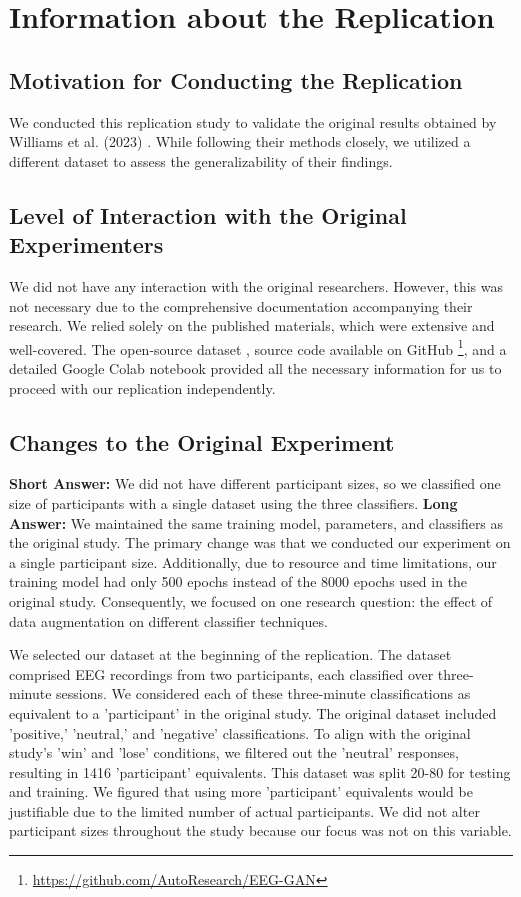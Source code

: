\documentclass[10pt,letterpaper]{article}
\begin{document}
\section{Information about the Replication}

\subsection{Motivation for Conducting the Replication}
We conducted this replication study to validate the original results obtained by Williams et al. (2023) \cite{originalpaper}. While following their methods closely, we utilized a different dataset \cite{ourdataset} to assess the generalizability of their findings.

\subsection{Level of Interaction with the Original Experimenters}
We did not have any interaction with the original researchers. However, this was not necessary due to the comprehensive documentation accompanying their research. We relied solely on the published materials, which were extensive and well-covered. The open-source dataset \cite{originaldataset}, source code available on GitHub \footnote{\url{https://github.com/AutoResearch/EEG-GAN}}, and a detailed Google Colab notebook provided all the necessary information for us to proceed with our replication independently.

\subsection{Changes to the Original Experiment}
\textbf{Short Answer:} We did not have different participant sizes, so we classified one size of participants with a single dataset using the three classifiers. \textbf{Long Answer:} We maintained the same training model, parameters, and classifiers as the original study. The primary change was that we conducted our experiment on a single participant size. Additionally, due to resource and time limitations, our training model had only 500 epochs instead of the 8000 epochs used in the original study. Consequently, we focused on one research question: the effect of data augmentation on different classifier techniques.

We selected our dataset at the beginning of the replication. The dataset \cite{ourdataset} comprised EEG recordings from two participants, each classified over three-minute sessions. We considered each of these three-minute classifications as equivalent to a 'participant' in the original study. The original dataset included 'positive,' 'neutral,' and 'negative' classifications. To align with the original study's 'win' and 'lose' conditions, we filtered out the 'neutral' responses, resulting in 1416 'participant' equivalents. This dataset was split 20-80 for testing and training. We figured that using more 'participant' equivalents would be justifiable due to the limited number of actual participants. We did not alter participant sizes throughout the study because our focus was not on this variable.
\end{document}
